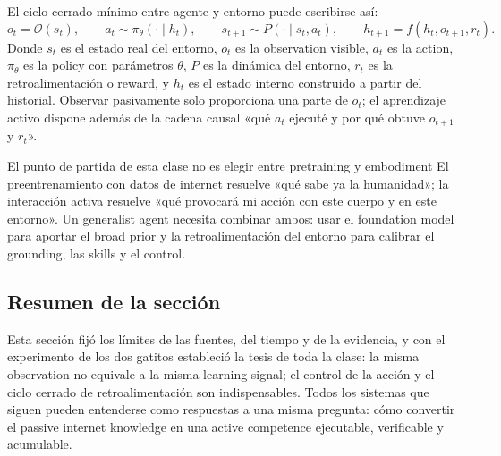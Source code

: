 El ciclo cerrado mínimo entre agente y entorno puede escribirse así:
\[
o_t = \mathcal{O}(s_t),\qquad a_t \sim \pi_\theta(\cdot\mid h_t),\qquad
s_{t+1}\sim P(\cdot\mid s_t,a_t),\qquad h_{t+1}=f(h_t,o_{t+1},r_t).
\]
Donde $s_t$ es el estado real del entorno, $o_t$ es la observation visible, $a_t$ es la action, $\pi_\theta$ es la policy con parámetros $\theta$, $P$ es la dinámica del entorno, $r_t$ es la retroalimentación o reward, y $h_t$ es el estado interno construido a partir del historial. Observar pasivamente solo proporciona una parte de $o_t$; el aprendizaje activo dispone además de la cadena causal «qué $a_t$ ejecuté y por qué obtuve $o_{t+1}$ y $r_t$».


\begin{importantbox}{El punto de partida de esta clase no es elegir entre pretraining y embodiment}
El preentrenamiento con datos de internet resuelve «qué sabe ya la humanidad»; la interacción activa resuelve «qué provocará mi acción con este cuerpo y en este entorno». Un generalist agent necesita combinar ambos: usar el foundation model para aportar el broad prior y la retroalimentación del entorno para calibrar el grounding, las skills y el control.
\end{importantbox}

\subsection{Resumen de la sección}

Esta sección fijó los límites de las fuentes, del tiempo y de la evidencia, y con el experimento de los dos gatitos estableció la tesis de toda la clase: la misma observation no equivale a la misma learning signal; el control de la acción y el ciclo cerrado de retroalimentación son indispensables. Todos los sistemas que siguen pueden entenderse como respuestas a una misma pregunta: cómo convertir el passive internet knowledge en una active competence ejecutable, verificable y acumulable.
